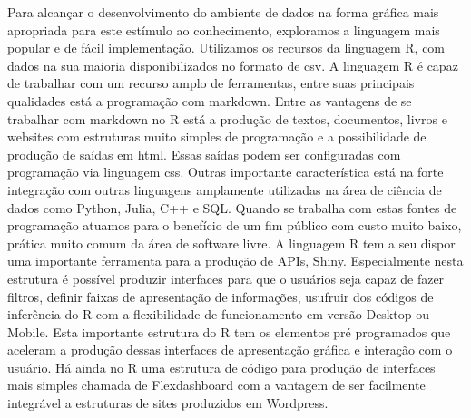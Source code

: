 \documentclass[
]{book}
\begin{document}
Para alcançar o desenvolvimento do ambiente de dados na forma gráfica mais apropriada para este estímulo ao conhecimento, exploramos a linguagem mais popular e de fácil implementação. Utilizamos os recursos da linguagem R, com dados na sua maioria disponibilizados no formato de csv. A linguagem R é capaz de trabalhar com um recurso amplo de ferramentas, entre suas principais qualidades está a programação com markdown. Entre as vantagens de se trabalhar com markdown no R está a produção de textos, documentos, livros e websites com estruturas muito simples de programação e a possibilidade de produção de saídas em html. Essas saídas podem ser configuradas com programação via linguagem css. Outras importante característica está na forte integração com outras linguagens amplamente utilizadas na área de ciência de dados como Python, Julia, C++ e SQL. Quando se trabalha com estas fontes de programação atuamos para o benefício de um fim público com custo muito baixo, prática muito comum da área de software livre. A linguagem R tem a seu dispor uma importante ferramenta para a produção de APIs, Shiny. Especialmente nesta estrutura é possível produzir interfaces para que o usuários seja capaz de fazer filtros, definir faixas de apresentação de informações, usufruir dos códigos de inferência do R com a flexibilidade de funcionamento em versão Desktop ou Mobile. Esta importante estrutura do R tem os elementos pré programados que aceleram a produção dessas interfaces de apresentação gráfica e interação com o usuário. Há ainda no R uma estrutura de código para produção de interfaces mais simples chamada de Flexdashboard com a vantagem de ser facilmente integrável a estruturas de sites produzidos em Wordpress.
\end{document}
